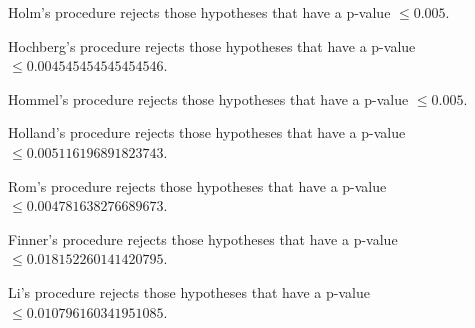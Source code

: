 \documentclass[a4paper,10pt]{article}
\begin{document}
\begin{landscape}
Holm's procedure rejects those hypotheses that have a p-value $\le0.005$.


Hochberg's procedure rejects those hypotheses that have a p-value $\le0.004545454545454546$.


Hommel's procedure rejects those hypotheses that have a p-value $\le0.005$.


Holland's procedure rejects those hypotheses that have a p-value $\le0.005116196891823743$.


Rom's procedure rejects those hypotheses that have a p-value $\le0.004781638276689673$.


Finner's procedure rejects those hypotheses that have a p-value $\le0.018152260141420795$.


Li's procedure rejects those hypotheses that have a p-value $\le0.010796160341951085$.



\newpage


\end{landscape}
\end{document}
